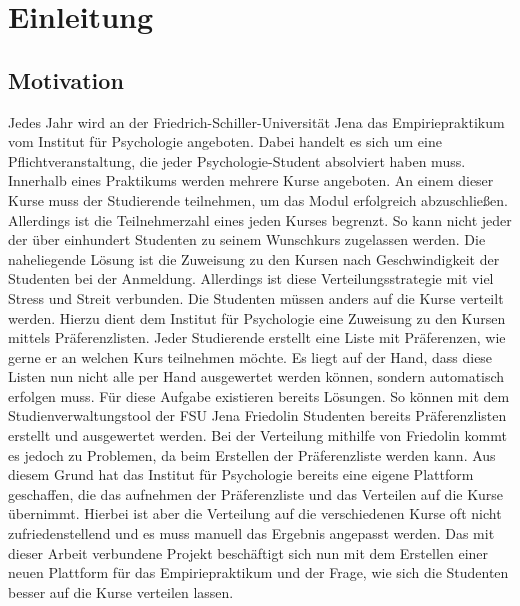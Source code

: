 \chapter{Einleitung}
\label{chapter:introduction}

    \section{Motivation}
    \label{sec:motivation}
        Jedes Jahr wird an der Friedrich-Schiller-Universität Jena das Empiriepraktikum vom Institut für Psychologie angeboten.
        Dabei handelt es sich um eine Pflichtveranstaltung, die jeder Psychologie-Student absolviert haben muss.
        Innerhalb eines Praktikums werden mehrere Kurse angeboten.
        An einem dieser Kurse muss der Studierende teilnehmen, um das Modul erfolgreich abzuschließen.
        Allerdings ist die Teilnehmerzahl eines jeden Kurses begrenzt.
        So kann nicht jeder der über einhundert Studenten zu seinem Wunschkurs zugelassen werden.
        Die naheliegende Lösung ist die Zuweisung zu den Kursen nach Geschwindigkeit der Studenten bei der Anmeldung.
        Allerdings ist diese Verteilungsstrategie mit viel Stress und Streit verbunden.
        Die Studenten müssen anders auf die Kurse verteilt werden.
        Hierzu dient dem Institut für Psychologie eine Zuweisung zu den Kursen mittels Präferenzlisten.
        Jeder Studierende erstellt eine Liste mit Präferenzen, wie gerne er an welchen Kurs teilnehmen möchte.
        Es liegt auf der Hand, dass diese Listen nun nicht alle per Hand ausgewertet werden können, sondern automatisch erfolgen muss.
        Für diese Aufgabe existieren bereits Lösungen.
        So können mit dem Studienverwaltungstool der FSU Jena Friedolin Studenten bereits Präferenzlisten erstellt und ausgewertet werden.
        Bei der Verteilung mithilfe von Friedolin kommt es jedoch zu Problemen, da beim Erstellen der Präferenzliste  werden kann.
        Aus diesem Grund hat das Institut für Psychologie bereits eine eigene Plattform geschaffen, die das aufnehmen der Präferenzliste und das Verteilen auf die Kurse übernimmt.
        Hierbei ist aber die Verteilung auf die verschiedenen Kurse oft nicht zufriedenstellend und es muss manuell das Ergebnis angepasst werden.
        Das mit dieser Arbeit verbundene Projekt beschäftigt sich nun mit dem Erstellen einer neuen Plattform für das Empiriepraktikum und der Frage, wie sich die Studenten besser auf die Kurse verteilen lassen.
        

